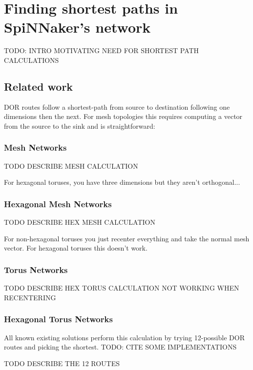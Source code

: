 \chapter{Finding shortest paths in SpiNNaker's network}
	
	TODO: INTRO MOTIVATING NEED FOR SHORTEST PATH CALCULATIONS
	
	\section{Related work}
		
		DOR routes follow a shortest-path from source to destination following one
		dimensions then the next. For mesh topologies this requires computing a
		vector from the source to the sink and is straightforward:
		
		\subsection{Mesh Networks}
			
			TODO DESCRIBE MESH CALCULATION
			
			For hexagonal toruses, you have three dimensions but they aren't
			orthogonal... \cite{patel15}
		
		\subsection{Hexagonal Mesh Networks}
			
			TODO DESCRIBE HEX MESH CALCULATION
			
			For non-hexagonal toruses you just recenter everything and take the normal
			mesh vector. For hexagonal toruses this doesn't work.
		
		\subsection{Torus Networks}
			
			TODO DESCRIBE HEX TORUS CALCULATION NOT WORKING WHEN RECENTERING
		
		\subsection{Hexagonal Torus Networks}
		
			All known existing solutions perform this calculation by trying 12-possible
			DOR routes and picking the shortest. TODO: CITE SOME IMPLEMENTATIONS
			
			TODO DESCRIBE THE 12 ROUTES
			
